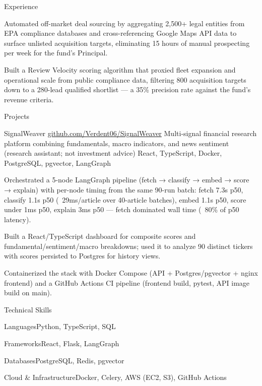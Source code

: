 \documentclass[
	11pt
]{../../../template}
\begin{document}
\begin{rSection}{E}{xperience}
\begin{rSectionEntry}
			\item Automated off-market deal sourcing by aggregating 2,500+ legal entities from EPA compliance databases and cross-referencing Google Maps API data to surface unlisted acquisition targets, eliminating 15 hours of manual prospecting per week for the fund's Principal.
			\item Built a Review Velocity scoring algorithm that proxied fleet expansion and operational scale from public compliance data, filtering 800 acquisition targets down to a 280-lead qualified shortlist --- a 35\% precision rate against the fund's revenue criteria.
		\end{rSectionEntry}
	\end{rSection}

	\begin{rSection}{P}{rojects}
		\begin{rSectionEntry}
			{SignalWeaver}
			{\href{https://github.com/Verdent06/SignalWeaver}{github.com/Verdent06/SignalWeaver}}
			{Multi-signal financial research platform combining fundamentals, macro indicators, and news sentiment (research assistant; not investment advice)}
			{React, TypeScript, Docker, PostgreSQL, pgvector, LangGraph}
			{}

			\item Orchestrated a 5-node LangGraph pipeline (fetch → classify → embed → score → explain) with per-node timing from the same 90-run batch: fetch 7.3s p50, classify 1.1s p50 (~29ms/article over 40-article batches), embed 1.1s p50, score under 1ms p50, explain 3ms p50 --- fetch dominated wall time (~80\% of p50 latency).
			\item Built a React/TypeScript dashboard for composite scores and fundamental/sentiment/macro breakdowns; used it to analyze 90 distinct tickers with scores persisted to Postgres for history views.
			\item Containerized the stack with Docker Compose (API + Postgres/pgvector + nginx frontend) and a GitHub Actions CI pipeline (frontend build, pytest, API image build on main).
		\end{rSectionEntry}
	\end{rSection}

	\begin{rSection}{T}{echnical Skills}
		\begin{rSet}{Languages}{Python, TypeScript, SQL}
		\end{rSet}
		\begin{rSet}{Frameworks}{React, Flask, LangGraph}
		\end{rSet}
		\begin{rSet}{Databases}{PostgreSQL, Redis, pgvector}
		\end{rSet}
		\begin{rSet}{Cloud \& Infrastructure}{Docker, Celery, AWS (EC2, S3), GitHub Actions}
		\end{rSet}
	\end{rSection}
\end{document}
